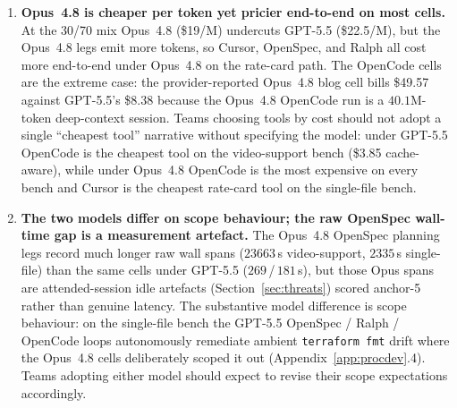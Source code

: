 \begin{enumerate}
doesn't) chiefly by tool, not by model
(Table~\ref{tab:regex-trap-cross-model} in the main text): it lands on
Cursor and Ralph under both models and never on OpenSpec. The
exception is OpenCode, which avoids the trap under Opus~4.8 (its plan
diagnoses the digit and broadens the regex up front) but falls into it
under GPT-5.5, the only cell where frontier-model substitution
changes the trap outcome. OpenSpec's spec format avoids it under both
models without inspecting the digit.
\item \textbf{Opus~4.8 is cheaper per token yet pricier end-to-end on
most cells.} At the 30/70 mix Opus~4.8 (\$19/M) undercuts GPT-5.5
(\$22.5/M), but the Opus~4.8 legs emit more tokens, so Cursor,
OpenSpec, and Ralph all cost more end-to-end under Opus~4.8 on the
rate-card path. The OpenCode cells are the extreme case: the
provider-reported Opus~4.8 blog cell bills \$49.57 against
GPT-5.5's \$8.38 because the Opus~4.8 OpenCode run is a $40.1$M-token
deep-context session. Teams choosing tools by cost should not adopt a
single ``cheapest tool'' narrative without specifying the model: under
GPT-5.5 OpenCode is the cheapest tool on the video-support bench (\$3.85
cache-aware), while under Opus~4.8 OpenCode is the most expensive on
every bench and Cursor is the cheapest rate-card tool on the single-file
bench.
\item \textbf{The two models differ on scope behaviour; the raw
OpenSpec wall-time gap is a measurement artefact.} The Opus~4.8 OpenSpec
planning legs record much longer raw wall spans ($23663$\,s
video-support, $2335$\,s single-file) than the same cells under GPT-5.5
($269$\,/\,$181$\,s), but those Opus spans are attended-session idle
artefacts (Section~\ref{sec:threats}) scored anchor-5 rather than genuine
latency. The substantive model difference is scope behaviour: on the
single-file bench the GPT-5.5 OpenSpec / Ralph / OpenCode loops
autonomously remediate ambient \texttt{terraform fmt} drift where the
Opus~4.8 cells deliberately scoped it out
(Appendix~\ref{app:procdev}.4). Teams adopting either model should
expect to revise their scope expectations accordingly.
\end{enumerate}
